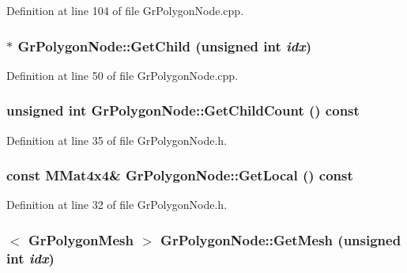 Definition at line 104 of file GrPolygonNode.cpp.\hypertarget{class_gr_polygon_node_80255bc65053efad7bdee15dc46e20b4}{
\subsubsection[{GetChild}]{ $\ast$ GrPolygonNode::GetChild (unsigned int {\em idx})}}
\label{class_gr_polygon_node_80255bc65053efad7bdee15dc46e20b4}




Definition at line 50 of file GrPolygonNode.cpp.\hypertarget{class_gr_polygon_node_a03bfe625d9cab1a0ec3ae35bbeb816c}{
\subsubsection[{GetChildCount}]{\setlength{\rightskip}{0pt plus 5cm}unsigned int GrPolygonNode::GetChildCount () const}}
\label{class_gr_polygon_node_a03bfe625d9cab1a0ec3ae35bbeb816c}




Definition at line 35 of file GrPolygonNode.h.\hypertarget{class_gr_polygon_node_8d035d5aba6b792c1a43823902922169}{
\subsubsection[{GetLocal}]{\setlength{\rightskip}{0pt plus 5cm}const {\bf MMat4x4}\& GrPolygonNode::GetLocal () const}}
\label{class_gr_polygon_node_8d035d5aba6b792c1a43823902922169}




Definition at line 32 of file GrPolygonNode.h.\hypertarget{class_gr_polygon_node_9c47d84b59e6f24aeae3879895db0ff9}{
\subsubsection[{GetMesh}]{$<$ {\bf GrPolygonMesh} $>$ GrPolygonNode::GetMesh (unsigned int {\em idx})}}
\label{class_gr_polygon_node_9c47d84b59e6f24aeae3879895db0ff9}




